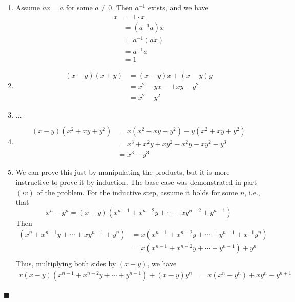 \documentclass[12pt]{article}
\renewcommand{\qed}{\hfill$\blacksquare$}
\renewenvironment{proof}{\begin{addmargin}[1em]{0em}\begin{newproof}}{\end{newproof}\end{addmargin}\qed}
\begin{document}
\begin{proof}
\begin{enumerate}[label=(\roman*)]
	\item Assume $ax=a$ for some $a\neq 0$. Then $a^{-1}$ exists, and we have
	\[ \begin{split} x & = 1\cdot x \\ & = \left(a^{-1}a\right)x \\ &= a^{-1} \left(ax\right) \\ &= a^{-1} a \\ & = 1\end{split}\]
	\item \[ \begin{split} \left(x-y\right)\left(x+y\right) & = \left(x-y\right)x + \left(x-y\right)y \\ & = x^2 - yx - +xy - y^2 \\ & = x^2 - y^2 \end{split} \]
	\item $\ldots$ 
	\item \[ \begin{split} \left(x-y\right)\left(x^2 + xy + y^2 \right) &=  x\left(x^2 + xy + y^2\right) - y \left(x^2 + xy + y^2\right) \\ & = x^3 + x^2 y + x y^2 - x^2y - xy^2 - y^3 \\ &= x^3 - y^3\end{split} \]
	\item We can prove this just by manipulating the products, but it is more instructive to prove it by induction. The base case was demonstrated in part $\left(iv\right)$ of the problem. For the inductive step, assume it holds for some $n$, i.e., that \[ x^n - y^n = \left(x-y\right)\left(x^{n-1} + x^{n-2}y + \cdots + xy^{n-2} + y^{n-1}\right) \] Then
	\begin{equation*}\begin{split}
		 \left(x^{n} + x^{n-1}y + \cdots + xy^{n-1} + y^{n}\right) &= x\left(x^{n-1} + x^{n-2}y + \cdots + y^{n-1} + x^{-1}y^{n}\right) \\
		 & = x \left(x^{n-1} + x^{n-2}y + \cdots + y^{n-1} \right) + y^n \\
	\end{split}\end{equation*} Thus,  multiplying both sides by $\left(x-y\right)$, we have
	\begin{equation*}\begin{split}
		x \left(x-y\right) \left(x^{n-1} + x^{n-2}y + \cdots + y^{n-1} \right) + \left(x-y\right) y^n & = x \left(x^n-y^n\right) + xy^n - y^{n+1} \\

\end{split}
\end{equation*}
\end{enumerate}
\end{proof}
\end{document}
